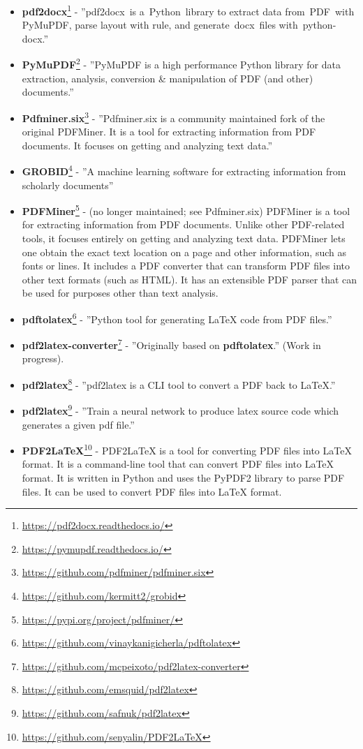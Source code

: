 \begin{itemize}
    \item \textbf{pdf2docx}\footnote{\url{https://pdf2docx.readthedocs.io/}} - ''pdf2docx is a Python library to extract data from PDF with PyMuPDF, parse layout with rule, and generate docx files with python-docx.''
    \item \textbf{PyMuPDF}\footnote{\url{https://pymupdf.readthedocs.io/}} - ''PyMuPDF is a high performance Python library for data extraction, analysis, conversion \& manipulation of PDF (and other) documents.''
    \item \textbf{Pdfminer.six}\footnote{\url{https://github.com/pdfminer/pdfminer.six}} - ''Pdfminer.six is a community maintained fork of the original PDFMiner. It is a tool for extracting information from PDF documents. It focuses on getting and analyzing text data.''
    \item \textbf{GROBID}\footnote{\url{https://github.com/kermitt2/grobid}} - ''A machine learning software for extracting information from scholarly documents''
    \item \textbf{PDFMiner}\footnote{\url{https://pypi.org/project/pdfminer/}} - (no longer maintained; see Pdfminer.six) PDFMiner is a tool for extracting information from PDF documents. Unlike other PDF-related tools, it focuses entirely on getting and analyzing text data. PDFMiner lets one obtain the exact text location on a page and other information, such as fonts or lines. It includes a PDF converter that can transform PDF files into other text formats (such as HTML). It has an extensible PDF parser that can be used for purposes other than text analysis.
    \item \textbf{pdftolatex}\footnote{\url{https://github.com/vinaykanigicherla/pdftolatex}} - ''Python tool for generating \LaTeX{} code from PDF files.''
    \item \textbf{pdf2latex-converter}\footnote{\url{https://github.com/mcpeixoto/pdf2latex-converter}} - ''Originally based on \textbf{pdftolatex}.'' (Work in progress).
    \item \textbf{pdf2latex}\footnote{\url{https://github.com/emsquid/pdf2latex}} - ''pdf2latex is a CLI tool to convert a PDF back to LaTeX.''
    \item \textbf{pdf2latex}\footnote{\url{https://github.com/safnuk/pdf2latex}} - ''Train a neural network to produce latex source code which generates a given pdf file.''
    \item \textbf{PDF2LaTeX}\footnote{\url{https://github.com/senyalin/PDF2LaTeX}} - PDF2LaTeX is a tool for converting PDF files into \LaTeX{} format. It is a command-line tool that can convert PDF files into \LaTeX{} format. It is written in Python and uses the PyPDF2 library to parse PDF files. It can be used to convert PDF files into \LaTeX{} format.

\end{itemize}
